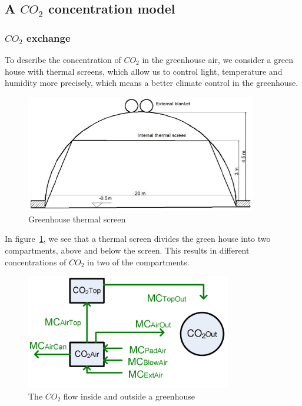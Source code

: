 \documentclass[a4paper]{article}
\begin{document}
\subsection{A \texorpdfstring{\(CO_2\)}{} concentration model}
\subsubsection{\texorpdfstring{\(CO_2\)}{} exchange}
To describe the concentration of \(CO_2\) in the greenhouse air, we consider a green house with thermal screens, which allow us to control light, temperature and humidity more precisely, which means a better climate control in the greenhouse.
\begin{figure}[H]
  \centering
  \includegraphics[width=0.9\textwidth]{thrscr.png}
  \caption{Greenhouse thermal screen}\label{fig:thrscr}
\end{figure}

In figure~\ref{fig:thrscr}, we see that a thermal screen divides the green house into two compartments, above and below the screen.
This results in different concentrations of \(CO_2\) in two of the compartments.
\begin{figure}[H]
  \centering
  \includegraphics[width=0.8\textwidth]{CO2}
  \caption{The \(CO_2\) flow inside and outside a greenhouse}\label{fig:CO2}
\end{figure}
\end{document}
